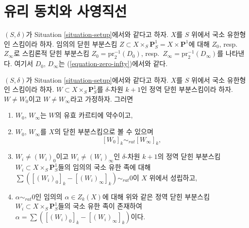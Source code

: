 \section{유리 동치와 사영직선}
\label{section-different-rational-equivalence}

\noindent
$(S, \delta)$가 Situation \ref{situation-setup}에서와 같다고 하자.
$X$를 $S$ 위에서 국소 유한형인 스킴이라 하자. 임의의 닫힌 부분스킴
$Z \subset X \times_S \mathbf{P}^1_S = X \times \mathbf{P}^1$에 대해
$Z_0$, resp.\ $Z_\infty$로 스킴론적 닫힌 부분스킴
$Z_0 = \text{pr}_2^{-1}(D_0)$, resp.\ $Z_\infty = \text{pr}_2^{-1}(D_\infty)$를
나타낸다. 여기서 $D_0$,
$D_\infty$는 (\ref{equation-zero-infty})에서와 같다.

\begin{lemma}
\label{lemma-rational-equivalence-family}
$(S, \delta)$가 Situation \ref{situation-setup}에서와 같다고 하자.
$X$를 $S$ 위에서 국소 유한형인 스킴이라 하자.
$W \subset X \times_S \mathbf{P}^1_S$를 $\delta$-차원 $k + 1$인 정역
닫힌 부분스킴이라 하자. $W \not = W_0$이고 $W \not = W_\infty$라고
가정하자. 그러면
\begin{enumerate}
\item $W_0$, $W_\infty$는 $W$의 유효 카르티에 약수이고,
\item $W_0$, $W_\infty$를 $X$의 닫힌 부분스킴으로 볼 수 있으며
$$
[W_0]_k \sim_{rat} [W_\infty]_k,
$$
\item $W_i \not = (W_i)_0$이고 $W_i \not = (W_i)_\infty$인
$\delta$-차원 $k + 1$의 정역 닫힌 부분스킴
$W_i \subset X \times_S \mathbf{P}^1_S$들의 임의의 국소 유한 족에 대해
$\sum ([(W_i)_0]_k - [(W_i)_\infty]_k) \sim_{rat} 0$이 $X$ 위에서
성립하고,
\item $\alpha \sim_{rat} 0$인 임의의 $\alpha \in Z_k(X)$에 대해
위와 같은 정역 닫힌 부분스킴
$W_i \subset X \times_S \mathbf{P}^1_S$들의 국소 유한 족이 존재하여
$\alpha = \sum ([(W_i)_0]_k - [(W_i)_\infty]_k)$이다.
\end{enumerate}
\end{lemma}

